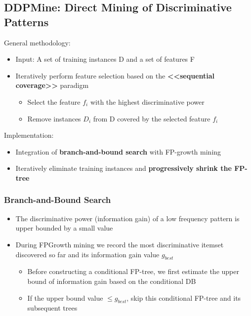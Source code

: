 \subsection{DDPMine: Direct Mining of Discriminative Patterns}
General methodology:
\begin{itemize}
\item Input: A set of training instances D and a set of features F
\item Iteratively perform feature selection based on the \textbf{<<sequential coverage>>} paradigm
\begin{itemize}
\item Select the feature $f_i$ with the highest discriminative power
\item Remove instances $D_i$ from D covered by the selected feature $f_i$
\end{itemize}
\end{itemize}

Implementation:
\begin{itemize}
\item Integration of \textbf{branch-and-bound search} with FP-growth mining
\item Iteratively eliminate training instances and \textbf{progressively shrink the FP-tree}
\end{itemize}

\subsubsection{Branch-and-Bound Search}
\begin{itemize}
\item The discriminative power (information gain) of a low frequency pattern is upper bounded by a small value
\item During FPGrowth mining we record the most discriminative itemset discovered so far and its information gain value $g_{best}$
\begin{itemize}
\item Before constructing a conditional FP-tree, we first estimate the upper bound of information gain based on the conditional DB
\item If the upper bound value $\leqslant g_{best}$, skip this conditional FP-tree and its subsequent trees
\end{itemize}
\end{itemize}



